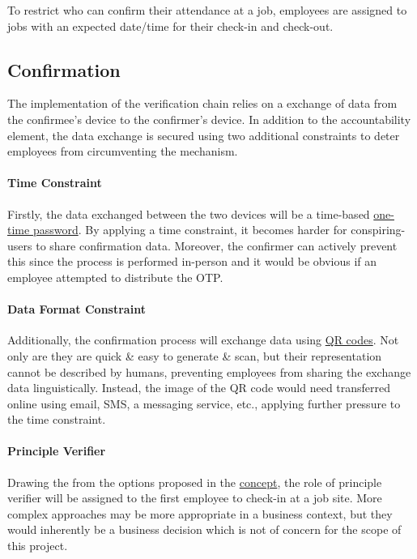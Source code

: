 To restrict who can confirm their attendance at a job,
employees are assigned to jobs with an expected date/time
for their check-in and check-out.

\subsection{Confirmation}

The implementation of the verification chain relies on a
exchange of data from the \gls{confirmee}'s device to the
\gls{confirmer}'s device.
In addition to the accountability element, the data
exchange is secured using two additional constraints to
deter employees from circumventing the mechanism.

\paragraph{Time Constraint}

Firstly, the data exchanged between the two devices will be
a time-based \hyperref[ss:otp]{one-time password}.
By applying a time constraint, it becomes harder for
\gls{conspiring-users} to share confirmation data.
Moreover, the confirmer can actively prevent this since the
process is performed in-person and it would be obvious if
an employee attempted to distribute the OTP.

\paragraph{Data Format Constraint}

Additionally, the confirmation process will exchange data
using \hyperref[ss:barcodes]{QR codes}.
Not only are they are quick \& easy to generate \& scan,
but their representation cannot be described by humans,
preventing employees from sharing the exchange data
linguistically.
Instead, the image of the QR code would need transferred
online using email, SMS, a messaging service, etc.,
applying further pressure to the time constraint.

\paragraph{Principle Verifier}
Drawing the from the options proposed in the
\hyperref[s:concept]{concept}, the role of principle
verifier will be assigned to the first employee to
\gls{check-in} at a job site.
More complex approaches may be more appropriate in a
business context, but they would inherently be a business
decision which is not of concern for the scope of this
project.


